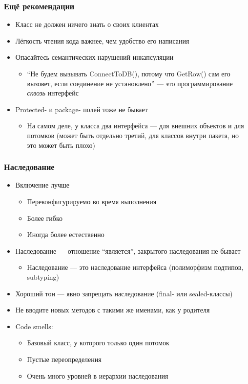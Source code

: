 \documentclass[xetex,mathserif,serif]{beamer}
\begin{document}
	\begin{frame}
		\frametitle{Ещё рекомендации}
		\begin{itemize}
			\item Класс не должен ничего знать о своих клиентах
			\item Лёгкость чтения кода важнее, чем удобство его написания
			\item Опасайтесь семантических нарушений инкапсуляции
			\begin{itemize}
				\item ``Не будем вызывать ConnectToDB(), потому что GetRow() сам его вызовет, если соединение не установлено'' --- это программирование \textit{сквозь} интерфейс
			\end{itemize}
			\item Protected- и package- полей тоже не бывает
			\begin{itemize}
				\item На самом деле, у класса два интерфейса --- для внешних объектов и для потомков (может быть отдельно третий, для классов внутри пакета, но это может быть плохо)
			\end{itemize}
		\end{itemize}
	\end{frame}

	\begin{frame}
		\frametitle{Наследование}
		\begin{itemize}
			\item Включение лучше
			\begin{itemize}
				\item Переконфигурируемо во время выполнения
				\item Более гибко
				\item Иногда более естественно
			\end{itemize}
			\item Наследование --- отношение ``является'', закрытого наследования не бывает
			\begin{itemize}
				\item Наследование --- это наследование интерфейса (полиморфизм подтипов, subtyping)
			\end{itemize}
			\item Хороший тон --- явно запрещать наследование (final- или sealed-классы)
			\item Не вводите новых методов с такими же именами, как у родителя
			\item Code smells:
			\begin{itemize}
				\item Базовый класс, у которого только один потомок
				\item Пустые переопределения
				\item Очень много уровней в иерархии наследования
			\end{itemize}
		\end{itemize}
	\end{frame}
\end{document}
